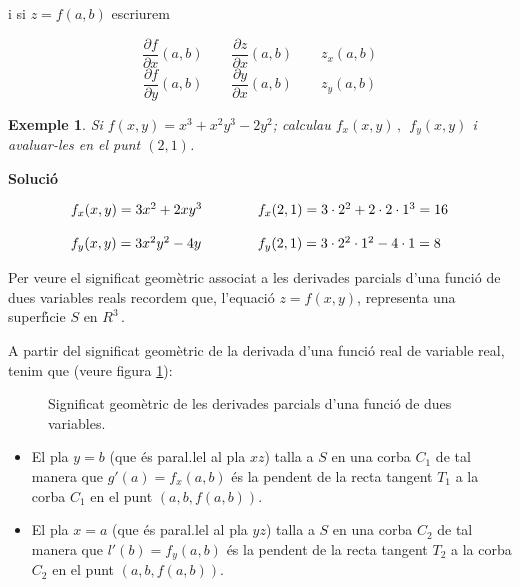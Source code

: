 \documentclass[12pt]{article}
\newcommand{\solucio}{\textbf{Soluci{\'o}}\ \ }
\newtheorem{exemple}{Exemple}[subsection]
\begin{document}
i si $z=f(a,b)$ escriurem

\[
\frac{\partial f}{\partial x}(a,b)\qquad \frac{\partial z}{\partial
x}(a,b)\qquad z_{x}(a,b)
\]
\[
\frac{\partial f}{\partial y}(a,b)\qquad\frac{\partial y}{\partial
x}(a,b)\qquad z_{y}(a,b)
\]


\vspace{0.4cm}
\begin{exemple}
Si $f(x,y)=x^{3}+x^{2}y^{3}-2y^{2}$; calculau $f_{x}(x,y)\,, \ \ f_{y}(x,y)$ i avaluar-les en el punt $(2,1)$.
\end{exemple}

\solucio

\[
\vspace{0.4cm}
\begin{array}{lcl}
f_{x}(x,y)=3x^{2}+2xy^{3} & \qquad & f_{x}(2,1) = 3 \cdot 2^{2}+2
\cdot 2 \cdot 1^{3} = 16 \\
&\\
 f_{y}(x,y)=3x^{2}y^{2}-4y & \qquad &
f_{y}(2,1) = 3 \cdot 2^{2} \cdot 1^{2} - 4 \cdot 1 = 8
\end{array}
\]

\vspace{0.5cm}

Per veure el significat geom{\`e}tric associat a les derivades parcials d'una
funci{\'o} de dues variables reals recordem que, l'equaci{\'o}
$z=f(x,y)$, representa una superf{\'\i}cie $S$ en $R^{3}\,.$

A partir del significat geom{\`e}tric de la derivada d'una funci{\'o} real
de variable real, tenim que (veure figura \ref{dfdv1}):

\vspace{-0.5cm}
\begin{figure}[h!]
\begin{center}

\end{center}\caption{Significat geom{\`e}tric de les derivades parcials d'una funci{\'o} de dues variables.}\label{dfdv1}
\end{figure}

\begin{itemize}
\item El pla $y=b$ (que {\'e}s paral.lel al pla $xz$) talla a $S$ en una corba $C_{1}$ de tal  manera que   $g'(a)=f_{x}(a,b)$ {\'e}s la pendent de la recta
tangent $T_{1}$ a la corba $C_{1}$ en el punt $(a,b,f(a,b))$.
\item El pla $x=a$ (que {\'e}s paral.lel al pla $yz$) talla a $S$ en una corba $C_{2}$ de tal  manera que   $l'(b)=f_{y}(a,b)$ {\'e}s la pendent de la recta
tangent $T_{2}$ a la corba $C_{2}$ en el punt $(a,b,f(a,b))$.
\end{itemize}
\end{document}
